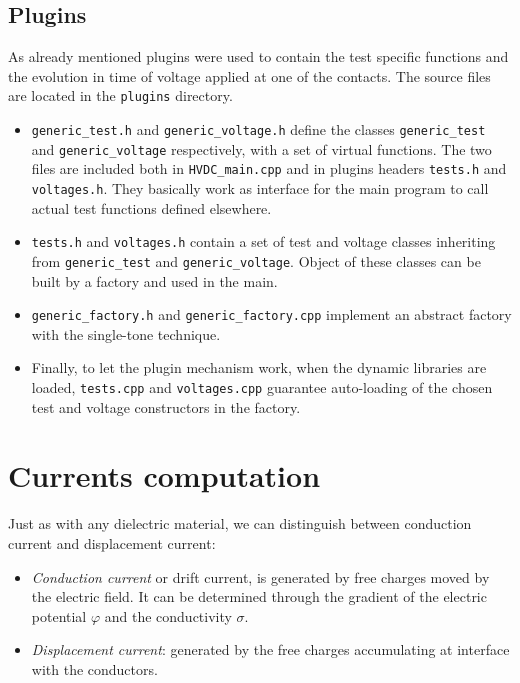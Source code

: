 \documentclass[11pt,a4paper]{article}
\begin{document}
\subsection{Plugins}
As already mentioned plugins were used to contain the test specific functions and the evolution in time of voltage applied at one of the contacts. The source files are located in the \texttt{plugins} directory. 
\begin{itemize}
	\item \texttt{generic\_test.h} and \texttt{generic\_voltage.h} define the classes \texttt{generic\_test} and \texttt{generic\_voltage} respectively, with a set of virtual functions. The two files are included both in \texttt{HVDC\_main.cpp} and in plugins headers \texttt{tests.h} and \texttt{voltages.h}. They basically work as interface for the main program to call actual test functions defined elsewhere.
	\item \texttt{tests.h} and \texttt{voltages.h} contain a set of test and voltage classes inheriting from \texttt{generic\_test} and \texttt{generic\_voltage}. Object of these classes can be built by a factory and used in the main.
	\item \texttt{generic\_factory.h} and \texttt{generic\_factory.cpp} implement an abstract factory with the single-tone technique.
	\item Finally, to let the plugin mechanism work, when the dynamic libraries are loaded, \texttt{tests.cpp} and \texttt{voltages.cpp} guarantee auto-loading of the chosen test and voltage constructors in the factory. 
\end{itemize}
\section{Currents computation}
Just as with any dielectric material, we can distinguish between conduction current and displacement current:
\begin{itemize}
	\item \textit{Conduction current} or drift current, is generated by free charges moved by the electric field. It can be determined through the gradient of the electric potential \(\varphi\) and the conductivity \(\sigma\).
	\item \textit{Displacement current}: generated by the free charges accumulating at interface with the conductors.
\end{itemize}
\end{document}
